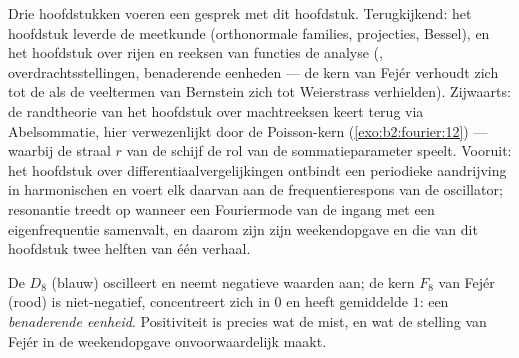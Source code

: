 \begin{remark}
Drie hoofdstukken voeren een gesprek met dit hoofdstuk.
Terugkijkend: het  hoofdstuk leverde de meetkunde
(orthonormale families, projecties, Bessel), en het hoofdstuk over
rijen en reeksen van functies de analyse (,
overdrachtsstellingen, benaderende eenheden --- de kern van Fejér
verhoudt zich tot de  als de veeltermen van
Bernstein zich tot Weierstrass verhielden). Zijwaarts: de
randtheorie van het hoofdstuk over machtreeksen keert terug via
Abelsommatie, hier verwezenlijkt door de Poisson-kern
(\cref{exo:b2:fourier:12}) --- waarbij de straal $r$ van de schijf
de rol van de sommatieparameter speelt. Vooruit: het hoofdstuk over
differentiaalvergelijkingen ontbindt een periodieke aandrijving in
harmonischen en voert elk daarvan aan de frequentierespons van de
oscillator; resonantie treedt op wanneer een Fouriermode van de
ingang met een eigenfrequentie samenvalt, en daarom zijn zijn
weekendopgave en die van dit hoofdstuk twee helften van één
verhaal.
\end{remark}

\begin{omfigure}

{\small De  $D_8$ (blauw) oscilleert en neemt
negatieve waarden aan; de kern $F_8$ van Fejér (rood) is
niet-negatief, concentreert zich in $0$ en heeft gemiddelde $1$:
een \emph{benaderende eenheid}. Positiviteit is precies wat de
 mist, en wat de stelling van Fejér in de
weekendopgave onvoorwaardelijk maakt.}
\end{omfigure}

